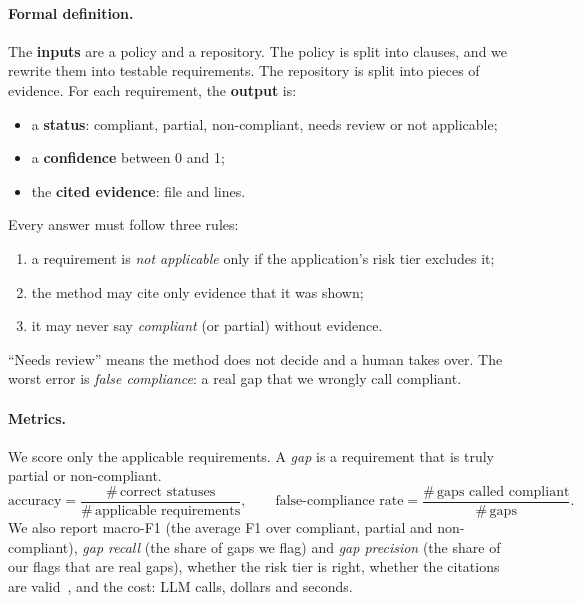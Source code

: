 \paragraph{Formal definition.} The \textbf{inputs} are a policy and a repository. The policy is split into clauses, and
we rewrite them into testable requirements. The repository is split into pieces of evidence. For each requirement, the
\textbf{output} is:
\begin{itemize}[leftmargin=*]
  \item a \textbf{status}: compliant, partial, non-compliant, needs review or not applicable;
  \item a \textbf{confidence} between 0 and 1;
  \item the \textbf{cited evidence}: file and lines.
\end{itemize}
Every answer must follow three rules:
\begin{enumerate}[leftmargin=*]
  \item a requirement is \emph{not applicable} only if the application's risk tier excludes it;
  \item the method may cite only evidence that it was shown;
  \item it may never say \emph{compliant} (or partial) without evidence.
\end{enumerate}
``Needs review'' means the method does not decide and a human takes over. The worst error is \emph{false compliance}:
a real gap that we wrongly call compliant.

\paragraph{Metrics.} We score only the applicable requirements. A \emph{gap} is a requirement that is truly partial or
non-compliant.
\begin{equation}
  \text{accuracy}=\frac{\#\,\text{correct statuses}}{\#\,\text{applicable requirements}},\qquad
  \text{false-compliance rate}=\frac{\#\,\text{gaps called compliant}}{\#\,\text{gaps}}.
\end{equation}
We also report macro-F1 (the average F1 over compliant, partial and non-compliant), \emph{gap recall} (the share of
gaps we flag) and \emph{gap precision} (the share of our flags that are real gaps), whether the risk tier is right,
whether the citations are valid~\cite{gao2023alce}, and the cost: LLM calls, dollars and seconds.
